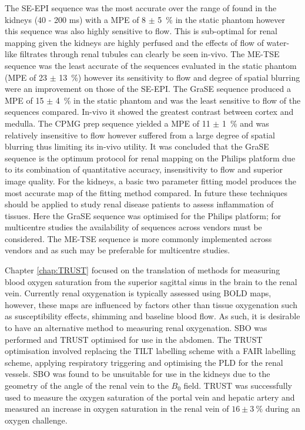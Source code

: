 The \ac{SE}-\ac{EPI} sequence was the most accurate over the range of \ttwo found in the kidneys (40 - 200 ms) with a \ac{MPE} of 8 $\pm$ 5~\% in the static phantom however this sequence was also highly sensitive to flow. This is sub-optimal for renal \ttwo mapping given the kidneys are highly perfused and the effects of flow of water-like filtrates through renal tubules can clearly be seen in-vivo. The \ac{ME-TSE} sequence was the least accurate of the sequences evaluated in the static phantom (\ac{MPE} of 23 $\pm$ 13~\%) however its sensitivity to flow and degree of spatial blurring were an improvement on those of the \ac{SE}-\ac{EPI}. The \ac{GraSE} sequence produced a \ac{MPE} of 15 $\pm$ 4~\% in the static phantom and was the least sensitive to flow of the sequences compared. In-vivo it showed the greatest contrast between cortex and medulla. The \ac{CPMG} \ttwo prep sequence yielded a \ac{MPE} of 11 $\pm$ 1~\% and was relatively insensitive to flow however suffered from a large degree of spatial blurring thus limiting its in-vivo utility. It was concluded that the \ac{GraSE} sequence is the optimum protocol for renal \ttwo mapping on the Philips platform due to its combination of quantitative accuracy, insensitivity to flow and superior image quality. For the kidneys, a basic two parameter fitting model produces the most accurate \ttwo map of the fitting method compared. In future these techniques should be applied to study renal disease patients to assess inflammation of tissues. Here the \ac{GraSE} sequence was optimised for the Philips platform; for multicentre studies the availability of sequences across vendors must be considered. The \ac{ME-TSE} sequence is more commonly implemented across vendors and as such may be preferable for multicentre studies.

Chapter \ref{chap:TRUST} focused on the translation of methods for measuring blood oxygen saturation from the superior sagittal sinus in the brain to the renal vein. Currently renal oxygenation is typically assessed using \ac{BOLD} \ttwostar maps, however, these maps are influenced by factors other than tissue oxygenation such as susceptibility effects, shimming and baseline blood flow. As such, it is desirable to have an alternative method to measuring renal oxygenation. \ac{SBO} was performed and \ac{TRUST} optimised for use in the abdomen. The \ac{TRUST} optimisation involved replacing the \ac{TILT} labelling scheme with a \ac{FAIR} labelling scheme, applying respiratory triggering and optimising the \ac{PLD} for the renal vessels. \ac{SBO} was found to be unsuitable for use in the kidneys due to the geometry of the angle of the renal vein to the $B_0$ field. \ac{TRUST} was successfully used to measure the oxygen saturation of the portal vein and hepatic artery and measured an increase in oxygen saturation in the renal vein of $16 \pm 3~\%$ during an oxygen challenge.

